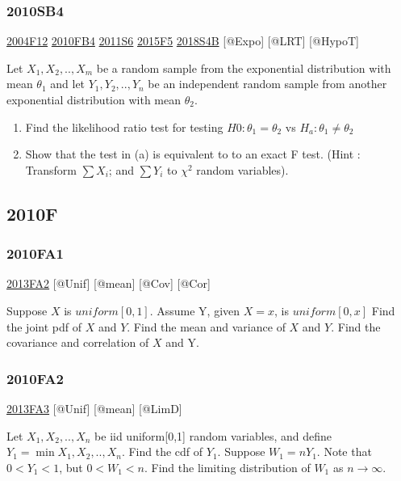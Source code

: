 \documentclass[6pt,twocolumn,Portrait]{article}
\begin{document}
\hypertarget{sb4}{%
\subsubsection{2010SB4}\label{sb4}}

\protect\hyperlink{f12}{2004F12} \protect\hyperlink{fb4-1}{2010FB4}
\protect\hyperlink{s6-2}{2011S6} \protect\hyperlink{f5-5}{2015F5}
\protect\hyperlink{s4b-2}{2018S4B} {[}@Expo{]} {[}@LRT{]} {[}@HypoT{]}

Let \(X_1,X_2,..,X_{m}\) be a random sample from the exponential
distribution with mean \(\theta_1\) and let \(Y_1,Y_2,..,Y_{n}\) be an
independent random sample from another exponential distribution with
mean \(\theta_2\).

\begin{enumerate}
\def\labelenumi{(\alph{enumi})}
\item
  Find the likelihood ratio test for testing \(H0:\theta_1=\theta_2\) vs
  \(H_a:\theta_1\neq\theta_2\)
\item
  Show that the test in (a) is equivalent to to an exact F test. (Hint :
  Transform \(\sum X_i\); and \(\sum Y_i\) to \(\chi^2\) random
  variables).
\end{enumerate}

\hypertarget{f-6}{%
\subsection{2010F}\label{f-6}}

\hypertarget{fa1-1}{%
\subsubsection{2010FA1}\label{fa1-1}}

\protect\hyperlink{fa2-2}{2013FA2} {[}@Unif{]} {[}@mean{]} {[}@Cov{]}
{[}@Cor{]}

Suppose \(X\) is \(uniform[0,1]\). Assume Y, given \(X=x\), is
\(uniform[0,x]\) Find the joint pdf of \(X\) and \(Y\). Find the mean
and variance of \(X\) and \(Y\). Find the covariance and correlation of
\(X\) and Y.

\hypertarget{fa2-1}{%
\subsubsection{2010FA2}\label{fa2-1}}

\protect\hyperlink{fa3-2}{2013FA3} {[}@Unif{]} {[}@mean{]} {[}@LimD{]}

Let \(X_1,X_2,..,X_{n}\) be iid uniform{[}0,1{]} random variables, and
define \(Y_1=\min{X_1,X_2,..,X_{n}}\). Find the cdf of \(Y_1\). Suppose
\(W_1=nY_1\). Note that \(0<Y_1<1\), but \(0<W_1<n\). Find the limiting
distribution of \(W_1\) as \(n\to\infty\).
\end{document}
